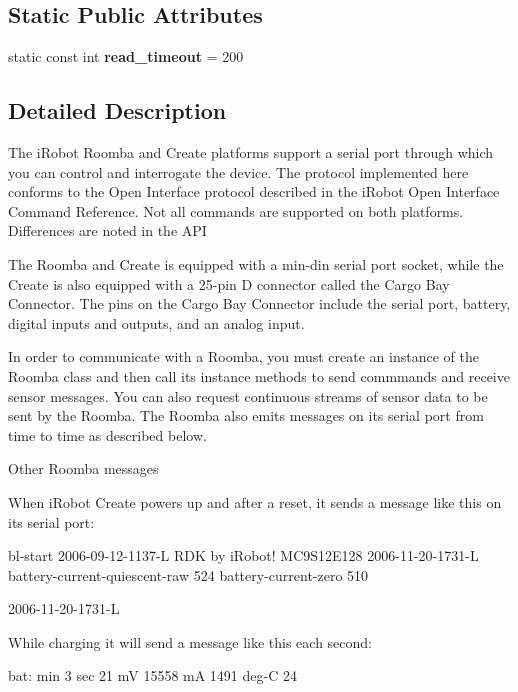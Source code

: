 \subsection*{Static Public Attributes}
\begin{DoxyCompactItemize}
\item 
\hypertarget{class_arduino_roomba_a42cc468013c3068764805c59b29e9ad1}{
static const int {\bfseries read\_\-timeout} = 200}
\label{class_arduino_roomba_a42cc468013c3068764805c59b29e9ad1}

\end{DoxyCompactItemize}


\subsection{Detailed Description}
The iRobot Roomba and Create platforms support a serial port through which you can control and interrogate the device. The protocol implemented here conforms to the Open Interface protocol described in the iRobot Open Interface Command Reference. Not all commands are supported on both platforms. Differences are noted in the API

The Roomba and Create is equipped with a min-\/din serial port socket, while the Create is also equipped with a 25-\/pin D connector called the Cargo Bay Connector. The pins on the Cargo Bay Connector include the serial port, battery, digital inputs and outputs, and an analog input.

In order to communicate with a Roomba, you must create an instance of the Roomba class and then call its instance methods to send commmands and receive sensor messages. You can also request continuous streams of sensor data to be sent by the Roomba. The Roomba also emits messages on its serial port from time to time as described below.

\begin{DoxyParagraph}{Other Roomba messages}

\end{DoxyParagraph}
When iRobot Create powers up and after a reset, it sends a message like this on its serial port: 
\begin{DoxyCode}
 bl-start
 2006-09-12-1137-L
 RDK by iRobot!
 MC9S12E128
 2006-11-20-1731-L
 battery-current-quiescent-raw 524  battery-current-zero 510

 2006-11-20-1731-L
\end{DoxyCode}


While charging it will send a message like this each second: 
\begin{DoxyCode}
 bat:   min 3  sec 21  mV 15558  mA 1491  deg-C 24
\end{DoxyCode}


